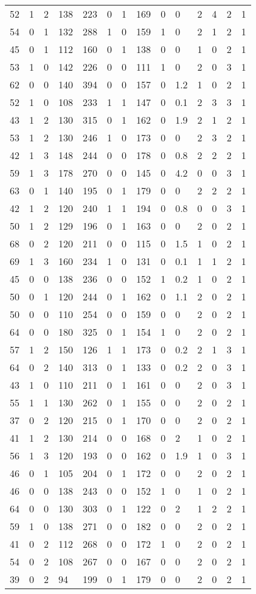 \documentclass{article}
\begin{document}
\begin{longtable}{|l|l|l|l|l|l|l|l|l|l|l|l|l|l|}
52&1&2&138&223&0&1&169&0&0&2&4&2&1 \\ 
54&0&1&132&288&1&0&159&1&0&2&1&2&1 \\ 
45&0&1&112&160&0&1&138&0&0&1&0&2&1 \\ 
53&1&0&142&226&0&0&111&1&0&2&0&3&1 \\ 
62&0&0&140&394&0&0&157&0&1.2&1&0&2&1 \\ 
52&1&0&108&233&1&1&147&0&0.1&2&3&3&1 \\ 
43&1&2&130&315&0&1&162&0&1.9&2&1&2&1 \\ 
53&1&2&130&246&1&0&173&0&0&2&3&2&1 \\ 
42&1&3&148&244&0&0&178&0&0.8&2&2&2&1 \\ 
59&1&3&178&270&0&0&145&0&4.2&0&0&3&1 \\ 
63&0&1&140&195&0&1&179&0&0&2&2&2&1 \\ 
42&1&2&120&240&1&1&194&0&0.8&0&0&3&1 \\ 
50&1&2&129&196&0&1&163&0&0&2&0&2&1 \\ 
68&0&2&120&211&0&0&115&0&1.5&1&0&2&1 \\ 
69&1&3&160&234&1&0&131&0&0.1&1&1&2&1 \\ 
45&0&0&138&236&0&0&152&1&0.2&1&0&2&1 \\ 
50&0&1&120&244&0&1&162&0&1.1&2&0&2&1 \\ 
50&0&0&110&254&0&0&159&0&0&2&0&2&1 \\ 
64&0&0&180&325&0&1&154&1&0&2&0&2&1 \\ 
57&1&2&150&126&1&1&173&0&0.2&2&1&3&1 \\ 
64&0&2&140&313&0&1&133&0&0.2&2&0&3&1 \\ 
43&1&0&110&211&0&1&161&0&0&2&0&3&1 \\ 
55&1&1&130&262&0&1&155&0&0&2&0&2&1 \\ 
37&0&2&120&215&0&1&170&0&0&2&0&2&1 \\ 
41&1&2&130&214&0&0&168&0&2&1&0&2&1 \\ 
56&1&3&120&193&0&0&162&0&1.9&1&0&3&1 \\ 
46&0&1&105&204&0&1&172&0&0&2&0&2&1 \\ 
46&0&0&138&243&0&0&152&1&0&1&0&2&1 \\ 
64&0&0&130&303&0&1&122&0&2&1&2&2&1 \\ 
59&1&0&138&271&0&0&182&0&0&2&0&2&1 \\ 
41&0&2&112&268&0&0&172&1&0&2&0&2&1 \\ 
54&0&2&108&267&0&0&167&0&0&2&0&2&1 \\ 
39&0&2&94&199&0&1&179&0&0&2&0&2&1 \\ 

\end{longtable}
\end{document}
